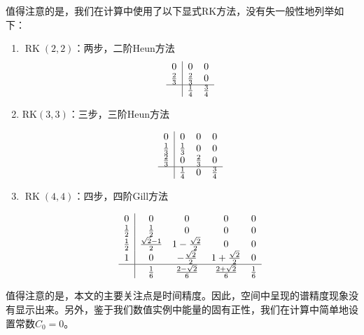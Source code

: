	值得注意的是，我们在计算中使用了以下显式RK方法，没有失一般性地列举如下：
	\begin{enumerate}
	\item $\operatorname{RK}(2,2)$：两步，二阶Heun方法 %
	\begin{equation}
	\begin{array}{c|cc}
	0 & 0 & 0 \\
	\frac{2}{3} & \frac{2}{3} & 0 \\
	\hline & \frac{1}{4} & \frac{3}{4}
	\end{array}
	\end{equation}
		
	\item $\mathrm{RK}(3,3)$：三步，三阶Heun方法 %
		
	\begin{equation}
	\begin{array}{c|ccc}
	0 & 0 & 0 & 0 \\
	\frac{1}{3} & \frac{1}{3} & 0 & 0 \\
	\frac{2}{3} & 0 & \frac{2}{3} & 0 \\
	\hline & \frac{1}{4} & 0 & \frac{3}{4}
	\end{array}
	\end{equation}
			
	\item $\operatorname{RK}(4,4)$：四步，四阶Gill方法 %
			
	\begin{equation}
	\begin{array}{c|cccc}
	0 & 0 & 0 & 0 & 0 \\
	\frac{1}{2} & \frac{1}{2} & 0 & 0 & 0 \\
	\frac{1}{2} & \frac{\sqrt{2}-1}{2} & 1-\frac{\sqrt{2}}{2} & 0 & 0 \\
	1 & 0 & -\frac{\sqrt{2}}{2} & 1+\frac{\sqrt{2}}{2} & 0 \\
	\hline & \frac{1}{6} & \frac{2-\sqrt{2}}{6} & \frac{2+\sqrt{2}}{6} & \frac{1}{6}
	\end{array}
	\end{equation}
	\end{enumerate}
	
	值得注意的是，本文的主要关注点是时间精度。因此，空间中呈现的谱精度现象没有显示出来。另外，鉴于我们数值实例中能量的固有正性，我们在计算中简单地设置常数$C_0=0$。
	
